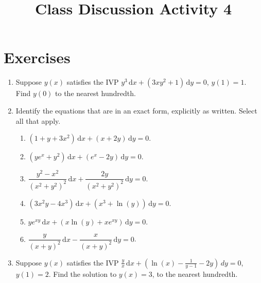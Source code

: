 \documentclass{ximera}
\begin{document}
\begin{abstract}
 \end{abstract}

    \title{Class Discussion Activity 4}
    
    \maketitle

\section*{Exercises}

\begin{enumerate}[label=(\arabic*)]

\item Suppose $y(x)$ satisfies the IVP $y^3\,\mathrm{d}x+(3xy^2+1)\,\mathrm{d}y=0$, $y(1)=1$.  Find $y(0)$ to the nearest hundredth.




\item Identify the equations that are in an exact form, explicitly as written.  Select all that apply.


\begin{enumerate}[label=(\alph*)]

\item $(1+y+3x^2)\,\mathrm{d}x+(x+2y)\,\mathrm{d}y=0$.  %


\item $\left(ye^x+y^2\right)\,\mathrm{d}x+(e^x-2y)\,\mathrm{d}y=0$.


\item $\dfrac{y^2-x^2}{(x^2+y^2)^2}\,\mathrm{d}x+\dfrac{2y}{(x^2+y^2)^2}\,\mathrm{d}y=0$.


\item $(3x^2y-4x^3)\,\mathrm{d}x+(x^3+\ln{(y)})\,\mathrm{d}y=0$.  %

\item $ye^{xy}\,\mathrm{d}x+\left(x\ln{(y)}+xe^{xy}\right)\,\mathrm{d}y=0$.

\item $\dfrac{y}{(x+y)^2}\,\mathrm{d}x-\dfrac{x}{(x+y)^2}\,\mathrm{d}y=0$.  %


\end{enumerate}



\item Suppose $y(x)$ satisfies the IVP $\displaystyle \frac{y}{x}\,\mathrm{d}x +\left(\ln{(x)}-\frac{1}{y-1}-2y\right)\, dy=0$, $y(1)=2$.  Find the solution to $y(x)=3$, to the nearest hundredth.


\end{enumerate}
\end{document}
